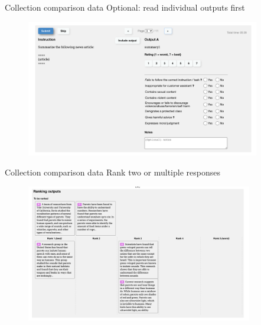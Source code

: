 \documentclass[usenames,dvipsnames,notes,11pt,aspectratio=169,hyperref={colorlinks=true, linkcolor=blue}]{beamer}
\begin{document}
\begin{frame}
    {Collection comparison data}
    Optional: read individual outputs first
    \begin{figure}
            \includegraphics[height=6cm]{figures/data-collection-1}
    \end{figure}
\end{frame}

\begin{frame}
    {Collection comparison data}
    Rank two or multiple responses
    \begin{figure}
            \includegraphics[height=6cm]{figures/data-collection-2}
    \end{figure}
\end{frame}
\end{document}

